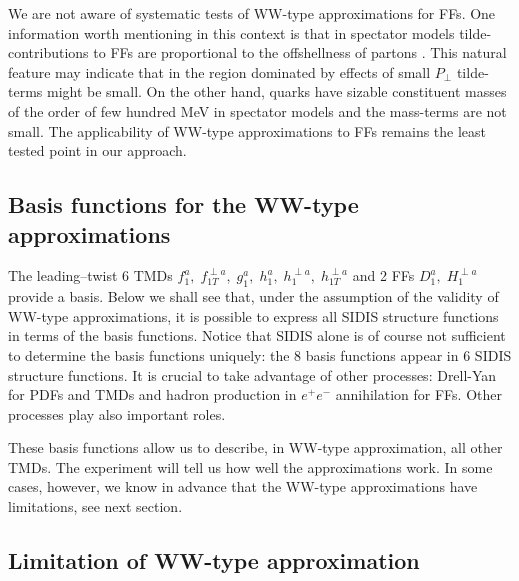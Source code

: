 \documentclass[a4paper,11pt]{article}
\begin{document}
We are not aware of systematic tests of WW-type approximations for FFs. One 
information worth mentioning in this context is that in spectator models 
\cite{Jakob:1997wg} tilde-contributions to FFs are proportional to the 
offshellness of partons %
\cite{Lorce:2014hxa,Lorce:2016ugb}. This
natural feature may indicate that in the region dominated by effects of
small $P_\perp$ tilde-terms might be small. On the other hand, quarks have 
sizable constituent masses of the order of few hundred MeV in spectator models 
and the mass-terms are not small. 
The applicability of WW-type approximations to FFs 
remains the least tested point in our approach.


\subsection{Basis functions for the WW-type approximations}
\label{Sec-3.7:basis}

The leading--twist 6 TMDs 
$f_1^a, \; f_{1T}^{\perp a}, \; g_1^a, \; h_1^a, \;h_1^{\perp a},\; h_{1T}^{\perp a}$
and 2 FFs $D_1^a, \; H_1^{\perp a}$ provide a basis.
Below we shall see that, under the assumption of the validity of WW-type 
approximations, it is possible to express all SIDIS structure functions
in terms of the basis functions. 
Notice that SIDIS alone is of course not sufficient to determine the basis
functions uniquely: the 8 basis functions appear in 6 SIDIS structure functions.
It is crucial to take advantage of other processes: Drell-Yan for PDFs and TMDs
and hadron production in $e^+e^-$ annihilation for FFs. Other processes 
play also important roles.

These basis functions allow us to describe, in WW-type approximation,
all other TMDs. The experiment will tell us how well the approximations work.
In some cases, however, we know in advance that the WW-type approximations 
have limitations, see next section.

\subsection{Limitation of WW-type approximation}
\label{Sec-3.8:limitations}
\end{document}
